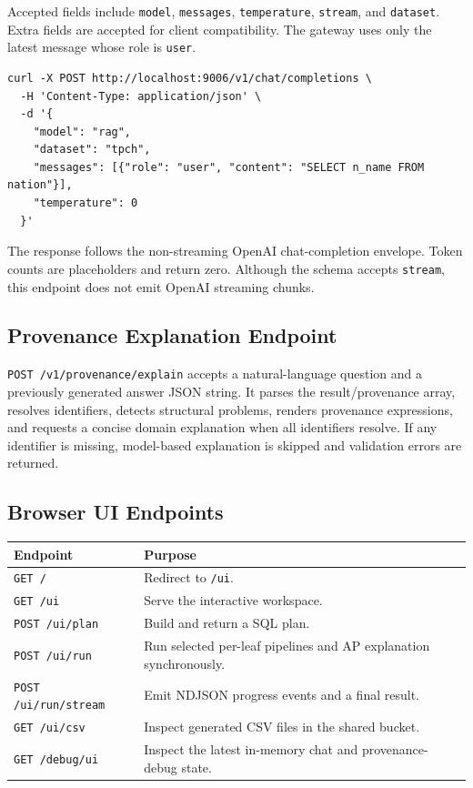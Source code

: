 \documentclass[11pt,a4paper]{article}
\newcommand{\code}[1]{\texttt{#1}}
\begin{document}
Accepted fields include \code{model}, \code{messages}, \code{temperature},
\code{stream}, and \code{dataset}. Extra fields are accepted for client
compatibility. The gateway uses only the latest message whose role is \code{user}.

\begin{lstlisting}[style=codestyle]
curl -X POST http://localhost:9006/v1/chat/completions \
  -H 'Content-Type: application/json' \
  -d '{
    "model": "rag",
    "dataset": "tpch",
    "messages": [{"role": "user", "content": "SELECT n_name FROM nation"}],
    "temperature": 0
  }'
\end{lstlisting}

The response follows the non-streaming OpenAI chat-completion envelope. Token
counts are placeholders and return zero. Although the schema accepts
\code{stream}, this endpoint does not emit OpenAI streaming chunks.

\subsection{Provenance Explanation Endpoint}

\code{POST /v1/provenance/explain} accepts a natural-language question and a
previously generated answer JSON string. It parses the result/provenance array,
resolves identifiers, detects structural problems, renders provenance expressions,
and requests a concise domain explanation when all identifiers resolve. If any
identifier is missing, model-based explanation is skipped and validation errors
are returned.

\subsection{Browser UI Endpoints}

\begin{longtable}{>{\raggedright\arraybackslash}p{} >{\raggedright\arraybackslash}p{}}
\toprule
\textbf{Endpoint} & \textbf{Purpose} \\
\midrule
\endhead
\code{GET /} & Redirect to \code{/ui}. \\
\code{GET /ui} & Serve the interactive workspace. \\
\code{POST /ui/plan} & Build and return a SQL plan. \\
\code{POST /ui/run} & Run selected per-leaf pipelines and AP explanation synchronously. \\
\code{POST /ui/run/stream} & Emit NDJSON progress events and a final result. \\
\code{GET /ui/csv} & Inspect generated CSV files in the shared bucket. \\
\code{GET /debug/ui} & Inspect the latest in-memory chat and provenance-debug state. \\
\bottomrule
\end{longtable}
\end{document}
